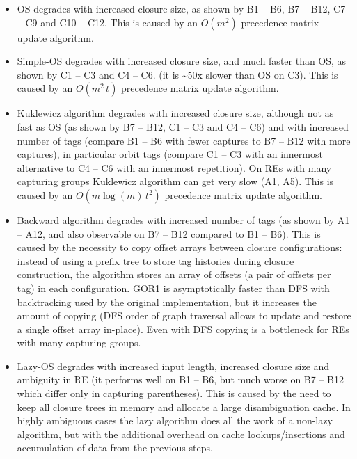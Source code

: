 \documentclass[AMA,STIX1COL]{WileyNJD-v2}
\begin{document}
\begin{itemize}[itemsep=0.2em, topsep=0.5em]
\item OS degrades with increased closure size,
    as shown by B1 -- B6, B7 -- B12, C7 -- C9 and C10 -- C12.
    This is caused by an $O(m^2)$ precedence matrix update algorithm.

\item Simple-OS degrades with increased closure size,
    and much faster than OS,
    as shown by C1 -- C3 and C4 -- C6. (it is \textasciitilde 50x slower than OS on C3).
    This is caused by an $O(m^2 \, t)$ precedence matrix update algorithm.

\item Kuklewicz algorithm degrades with increased closure size, although not as fast as OS (as shown by B7 -- B12, C1 -- C3 and C4 -- C6)
    and with increased number of tags (compare B1 -- B6 with fewer captures to B7 -- B12 with more captures),
    in particular orbit tags (compare C1 -- C3 with an innermost alternative to C4 -- C6 with an innermost repetition).
    On REs with many capturing groups Kuklewicz algorithm can get very slow (A1, A5).
    This is caused by an $O(m \log(m) \, t^2)$ precedence matrix update algorithm.

\item Backward algorithm degrades with increased number of tags
    (as shown by A1 -- A12, and also observable on B7 -- B12 compared to B1 -- B6).
    This is caused by the necessity to copy offset arrays between closure configurations:
    instead of using a prefix tree to store tag histories during closure construction,
    the algorithm stores an array of offsets (a pair of offsets per tag) in each configuration.
    GOR1 is asymptotically faster than DFS with backtracking used by the original implementation\cite{Cox09},
    but it increases the amount of copying
    (DFS order of graph traversal allows to update and restore a single offset array in-place).
    Even with DFS copying is a bottleneck for REs with many capturing groups.

\item Lazy-OS degrades with increased input length, increased closure size and ambiguity in RE
    (it performs well on B1 -- B6, but much worse on B7 -- B12 which differ only in capturing parentheses).
    This is caused by the need to keep all closure trees in memory and allocate a large disambiguation cache.
    In highly ambiguous cases the lazy algorithm does all the work of a non-lazy algorithm,
    but with the additional overhead on cache lookups/insertions and accumulation of data from the previous steps.


\end{itemize}
\end{document}
